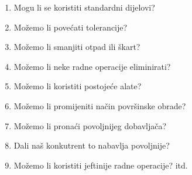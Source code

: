 \documentclass[a4paper,12pt]{article}
\numberwithin{figure}{section}
\begin{document}
\begin{enumerate}
\begin{center}
\begin{enumerate}
\item Mogu li se koristiti standardni dijelovi?
\item Možemo li povećati tolerancije?
\item Možemo li smanjiti otpad ili škart?
\item Možemo li neke radne operacije eliminirati?
\item Možemo li koristiti postojeće alate?
\item Možemo li promijeniti način površinske obrade?
\item Možemo li pronaći povoljnijeg dobavljača?
\item Dali naš konkutrent to nabavlja povoljnije?
\item Možemo li koristiti jeftinije radne operacije? itd.
\end{enumerate}
\end{center} 
\end{enumerate}
\end{document}
